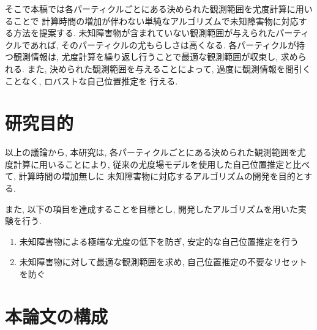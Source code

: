 そこで本稿では各パーティクルごとにある決められた観測範囲を尤度計算に用いることで
計算時間の増加が伴わない単純なアルゴリズムで未知障害物に対応する方法を提案する. 
未知障害物が含まれていない観測範囲が与えられたパーティクルであれば, 
そのパーティクルの尤もらしさは高くなる. 
各パーティクルが持つ観測情報は, 尤度計算を繰り返し行うことで最適な観測範囲が収束し, 求められる. 
また, 決められた観測範囲を与えることによって, 過度に観測情報を間引くことなく, ロバストな自己位置推定を
行える. 

\section{研究目的}
以上の議論から, 本研究は, 
各パーティクルごとにある決められた観測範囲を尤度計算に用いることにより, 
従来の尤度場モデルを使用した自己位置推定と比べて, 計算時間の増加無しに
未知障害物に対応するアルゴリズムの開発を目的とする. 

また, 以下の項目を達成することを目標とし, 開発したアルゴリズムを用いた実験を行う. 

\begin{enumerate}
  \item 未知障害物による極端な尤度の低下を防ぎ, 安定的な自己位置推定を行う
  \item 未知障害物に対して最適な観測範囲を求め, 自己位置推定の不要なリセットを防ぐ
\end{enumerate}

\section{本論文の構成}
